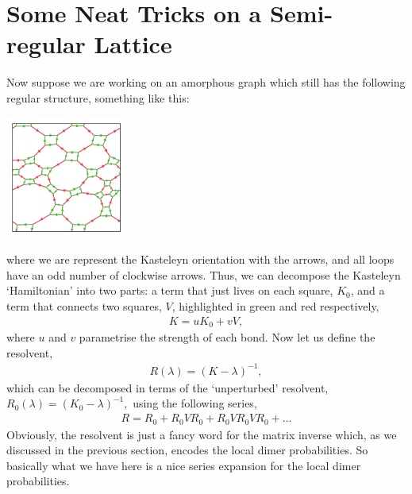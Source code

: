 \documentclass[11pt, oneside]{article} %
\numberwithin{equation}{section}
\begin{document}
\section{Some Neat Tricks on a Semi-regular Lattice}
Now suppose we are working on an amorphous graph which still has the following regular structure, something like this:
\begin{center}
    \includegraphics[width=0.3\textwidth]{lattice.png}
\end{center}
where we are represent the Kasteleyn orientation with the arrows, and all loops have an odd number of clockwise arrows. Thus, we can decompose the Kasteleyn `Hamiltonian' into two parts: a term that just lives on each square, $K_{0}$, and a term that connects two squares, $V$, highlighted in green and red respectively,
\begin{align}
    K = u K_{0} + v V,
\end{align}
where $u$ and $v$ parametrise the strength of each bond. Now let us define the resolvent,
\begin{align}
    R(\lambda) = (K-\lambda)^{-1},
\end{align}
which can be decomposed in terms of the `unperturbed' resolvent, $R_0(\lambda) = ( K_0 - \lambda )^{-1},$ using the following series,
\begin{align} \label{eqn:resolvent_expansion}
     R = R_0 + R_0VR_0 + R_0VR_0VR_0 + ...
\end{align}
Obviously, the resolvent is just a fancy word for the matrix inverse which, as we discussed in the previous section, encodes the local dimer probabilities. So basically what we have here is a nice series expansion for the local dimer probabilities. 
\end{document}

